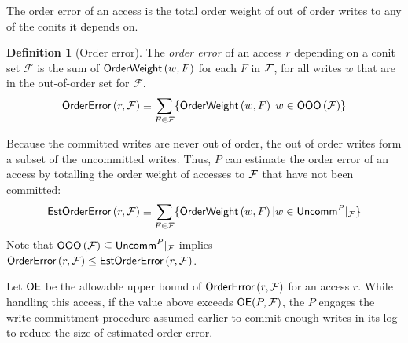 \documentclass[]             %
{NASA}                       %
\theoremstyle{definition}
\newtheorem{definition}[theorem]{Definition}
\begin{document}
The order error of an access is the total order weight of out of order
writes to any of the conits it depends on.
\begin{definition}[Order error]
  The \emph{order error} of an access $r$ depending on a conit set
  $\mathcal{F}$ is the sum of $\mathsf{OrderWeight}\left(w, F\right)$ for
  each $F$ in $\mathcal{F}$, for all writes $w$ that are in the out-of-order
  set for $\mathcal{F}$.
  \begin{equation}
    \mathsf{OrderError}\left(r, \mathcal{F}\right) \equiv \sum_{F \in \mathcal{F}} \{ \mathsf{OrderWeight}\left(w, F\right) | w \in \mathsf{OOO}\left(\mathcal{F}\right) \}
  \end{equation}
\end{definition}


Because the committed writes are never out of order, the out of order
writes form a subset of the uncommitted writes. Thus, $P$ can estimate
the order error of an access by totalling the order weight of accesses
to $\mathcal{F}$ that have not been committed:
\begin{equation}
  \mathsf{EstOrderError}\left(r, \mathcal{F}\right) \equiv \sum_{F \in \mathcal{F}} \{ \mathsf{OrderWeight}\left(w, F\right) | w \in \mathsf{Uncomm}^{P}|_{\mathcal{F}} \}
\end{equation}
Note that $\mathsf{OOO}\left(\mathcal{F}\right) \subseteq \mathsf{Uncomm}^{P}|_{\mathcal{F}}$ implies $\mathsf{OrderError}\left(r, \mathcal{F}\right) \leq \mathsf{EstOrderError}\left(r, \mathcal{F}\right)$.

Let $\mathsf{OE}$ be the allowable upper bound of
$\mathsf{OrderError}\left(r,\mathcal{F}\right)$ for an access $r$. While
handling this access, if the value above exceeds $\mathsf{OE}(P, \mathcal{F})$,
the $P$ engages the write committment procedure assumed earlier to
commit enough writes in its log to reduce the size of estimated order
error.

\end{document}
